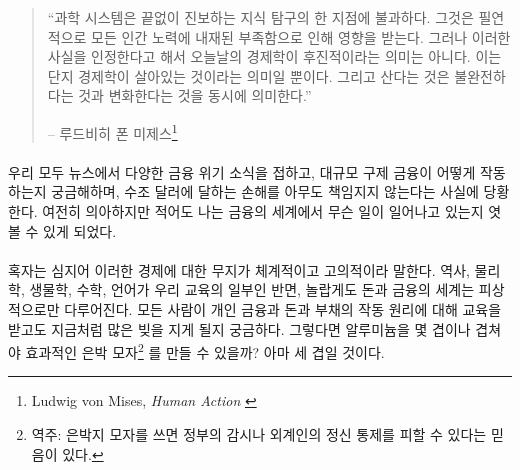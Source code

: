 \begin{quotation}\begin{samepage}
		\enquote{과학 시스템은 끝없이 진보하는 지식 탐구의 한 지점에 불과하다. 
			그것은 필연적으로 모든 인간 노력에 내재된 부족함으로 인해 영향을 받는다.
			그러나 이러한 사실을 인정한다고 해서 오늘날의 경제학이 후진적이라는 의미는 아니다.
			이는 단지 경제학이 살아있는 것이라는 의미일 뿐이다. 
			그리고 산다는 것은 불완전하다는 것과 변화한다는 것을 동시에 의미한다.}
		\begin{flushright} -- 루드비히 폰 미제스\footnote{Ludwig von Mises, \textit{Human Action}
				\cite{human-action}}
\end{flushright}\end{samepage}\end{quotation}


\paragraph{}
우리 모두 뉴스에서 다양한 금융 위기 소식을 접하고, 대규모 구제 금융이 어떻게 작동하는지 궁금해하며, 
수조 달러에 달하는 손해를 아무도 책임지지 않는다는 사실에 당황한다.
여전히 의아하지만 적어도 나는 금융의 세계에서 무슨 일이 일어나고 있는지 엿볼 수 있게 되었다.

\paragraph{}
혹자는 심지어 이러한 경제에 대한 무지가 체계적이고 고의적이라 말한다.
역사, 물리학, 생물학, 수학, 언어가 우리 교육의 일부인 반면, 
놀랍게도 돈과 금융의 세계는 피상적으로만 다루어진다. 
모든 사람이 개인 금융과 돈과 부채의 작동 원리에 대해 교육을 받고도 지금처럼 많은 빚을 지게 될지 궁금하다.
그렇다면 알루미늄을 몇 겹이나 겹쳐야 효과적인 은박 모자\footnote{역주: 은박지 모자를 쓰면 정부의 감시나 외계인의 정신 통제를 피할 수 있다는 믿음이 있다.}
를 만들 수 있을까? 아마 세 겹일 것이다.

